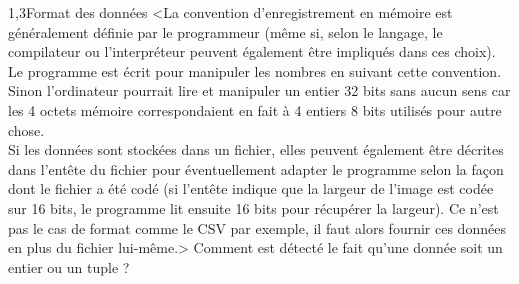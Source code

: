 \begin{quiz}[title={Organisation des données}]
\begin{quizquestion}[b]{2}{1,3}{Format des données}
<La convention d'enregistrement en mémoire est généralement définie par le programmeur (même si, selon le langage, le compilateur ou l’interpréteur peuvent également être impliqués dans ces choix). Le programme est écrit pour manipuler les nombres en suivant cette convention. Sinon l'ordinateur pourrait lire et manipuler un entier 32 bits sans aucun sens car les 4 octets mémoire correspondaient en fait à 4 entiers 8 bits utilisés pour autre chose.\\
Si les données sont stockées dans un fichier, elles peuvent également être décrites dans l'entête du fichier pour éventuellement adapter le programme selon la façon dont le fichier a été codé (si l'entête indique que la largeur de l'image est codée sur 16 bits, le programme lit ensuite 16 bits pour récupérer la largeur). Ce n'est pas le cas de format comme le CSV par exemple, il faut alors fournir ces données en plus du fichier lui-même.>
Comment est détecté le fait qu'une donnée soit un entier ou un tuple ? %
\end{quizquestion}


\end{quiz}
